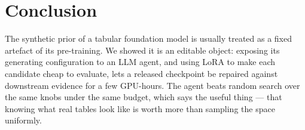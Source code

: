 \documentclass{article}
\begin{document}
\section{Conclusion}

The synthetic prior of a tabular foundation model is usually treated as a fixed artefact of
its pre-training. We showed it is an editable object: exposing its generating configuration
to an LLM agent, and using LoRA to make each candidate cheap to evaluate, lets a released
checkpoint be repaired against downstream evidence for a few GPU-hours. The agent beats
random search over the same knobs under the same budget, which says the useful thing --- that
knowing what real tables look like is worth more than sampling the space uniformly.



\end{document}

